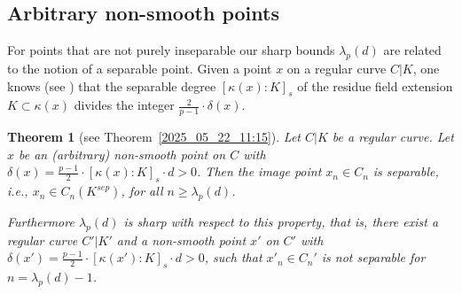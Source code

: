 \documentclass[12pt,reqno]{amsart}%
\newtheorem{thm}[prop]{Theorem}
\theoremstyle{definition}
\theoremstyle{remark}
\newcommand{\su}{\subset}
\newcommand{\ov}{\overline}
\newcommand{\de}{\delta}
\newcommand{\ka}{\kappa}
\newcommand{\lam}{\lambda}
\begin{document}



\subsection{Arbitrary non-smooth points}
For points that are not purely inseparable our sharp bounds $\lam_p(d)$ are related to the notion of a separable point.
Given a point $x$ on a regular curve $C|K$, one knows (see \cite[Corollary~2.16]{HiSt22}) that the separable degree $[\ka(x):K]_s$ of the residue field extension $K \su \ka(x)$ divides the integer $\frac 2 {p-1} {\cdot} \de(x)$.

\begin{thm}[see Theorem~\ref{2025_05_22_11:15}]
Let $C|K$ be a regular curve. 
Let $x$ be an (arbitrary) non-smooth point on $C$ with $\de(x) = \frac{p-1}2 {\cdot} [\ka(x):K]_s {\cdot} d > 0$.
Then the image point $x_n \in C_n$ is separable, i.e., $x_n \in C_n(K^{sep})$, for all $n \geq \lam_p (d)$.

Furthermore $\lam_p(d)$ is sharp with respect to this property, that is, there exist a regular curve $C'|K'$ and a non-smooth point $x'$ on $C'$ with $\de(x') = \frac{p-1}2 {\cdot} [\ka(x'):K]_s {\cdot} d > 0$, such that $x'_n \in C_n'$ is not separable for $n=\lam_p(d)-1$.
\end{thm}
\end{document}
